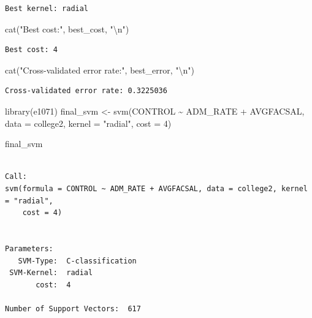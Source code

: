 \documentclass[
  letterpaper,
  DIV=11,
  numbers=noendperiod]{scrartcl}
\newenvironment{Shaded}{\begin{snugshade}}{\end{snugshade}}
\newcommand{\AttributeTok}[1]{\textcolor[rgb]{0.40,0.45,0.13}{#1}}
\newcommand{\DecValTok}[1]{\textcolor[rgb]{0.68,0.00,0.00}{#1}}
\newcommand{\FunctionTok}[1]{\textcolor[rgb]{0.28,0.35,0.67}{#1}}
\newcommand{\NormalTok}[1]{\textcolor[rgb]{0.00,0.23,0.31}{#1}}
\newcommand{\OtherTok}[1]{\textcolor[rgb]{0.00,0.23,0.31}{#1}}
\newcommand{\SpecialCharTok}[1]{\textcolor[rgb]{0.37,0.37,0.37}{#1}}
\newcommand{\StringTok}[1]{\textcolor[rgb]{0.13,0.47,0.30}{#1}}
\begin{document}
\begin{verbatim}
Best kernel: radial 
\end{verbatim}

\begin{Shaded}
\begin{Highlighting}[]
\FunctionTok{cat}\NormalTok{(}\StringTok{"Best cost:"}\NormalTok{, best\_cost, }\StringTok{"}\SpecialCharTok{\textbackslash{}n}\StringTok{"}\NormalTok{)}
\end{Highlighting}
\end{Shaded}

\begin{verbatim}
Best cost: 4 
\end{verbatim}

\begin{Shaded}
\begin{Highlighting}[]
\FunctionTok{cat}\NormalTok{(}\StringTok{"Cross{-}validated error rate:"}\NormalTok{, best\_error, }\StringTok{"}\SpecialCharTok{\textbackslash{}n}\StringTok{"}\NormalTok{)}
\end{Highlighting}
\end{Shaded}

\begin{verbatim}
Cross-validated error rate: 0.3225036 
\end{verbatim}

\begin{Shaded}
\begin{Highlighting}[]
\FunctionTok{library}\NormalTok{(e1071)}
\NormalTok{final\_svm }\OtherTok{\textless{}{-}} \FunctionTok{svm}\NormalTok{(CONTROL }\SpecialCharTok{\textasciitilde{}}\NormalTok{ ADM\_RATE }\SpecialCharTok{+}\NormalTok{ AVGFACSAL, }\AttributeTok{data =}\NormalTok{ college2,}
                 \AttributeTok{kernel =} \StringTok{"radial"}\NormalTok{, }\AttributeTok{cost =} \DecValTok{4}\NormalTok{)}
\end{Highlighting}
\end{Shaded}

\begin{Shaded}
\begin{Highlighting}[]
\NormalTok{final\_svm}
\end{Highlighting}
\end{Shaded}

\begin{verbatim}

Call:
svm(formula = CONTROL ~ ADM_RATE + AVGFACSAL, data = college2, kernel = "radial", 
    cost = 4)


Parameters:
   SVM-Type:  C-classification 
 SVM-Kernel:  radial 
       cost:  4 

Number of Support Vectors:  617
\end{verbatim}
\end{document}
